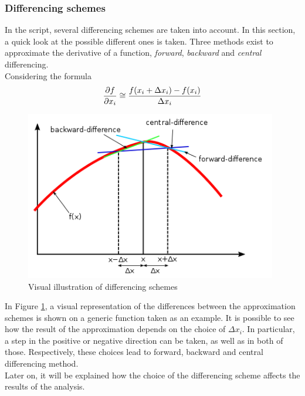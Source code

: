 \subsubsection{Differencing schemes}
In the script, several differencing schemes are taken into account. 
In this section, a quick look at the possible different ones is taken. Three methods exist to approximate the derivative of a function, \textit{forward}, \textit{backward} and \textit{central} differencing.\\[6pt]
Considering the formula 
\begin{equation}
\pdv{f}{x_i} \cong \frac{f(x_i + \Delta x_i) - f(x_i)}{\Delta x_i}
\end{equation}
\begin{figure}[ht]
  \centering
  \includegraphics[width=110mm]{images/differencing.png}
  \caption{Visual illustration of differencing schemes\\ \cite{wiki:finiteDifference}}
  \label{fig:differencingschemes}
\end{figure}
In Figure \ref{fig:differencingschemes}, a visual representation of the differences between the approximation schemes is shown on a generic function taken as an example.
It is possible to see how the result of the approximation depends on the choice of $\Delta x_i$.
In particular, a step in the positive or negative direction can be taken, as well as in both of those. Respectively, these choices lead to forward, backward and central differencing method. \cite{masching_dissertation} \\[6pt]
Later on, it will be explained how the choice of the differencing scheme affects the results of the analysis.





